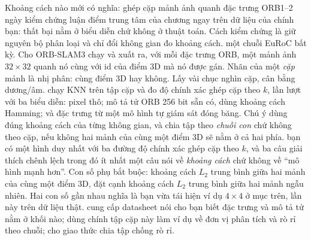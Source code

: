 \documentclass[../../deep_learning.tex]{subfiles}
\begin{document}
\begin{duan}{Khoảng cách nào mới có nghĩa: ghép cặp mảnh ảnh quanh đặc trưng ORB}{1--2 ngày}
\dmt kiểm chứng luận điểm trung tâm của chương ngay trên dữ liệu của chính bạn: thất bại nằm ở biểu diễn chứ không ở thuật toán. Cách kiểm chứng là giữ nguyên bộ phân loại và chỉ đổi không gian đo khoảng cách.
\ddl một chuỗi EuRoC bất kỳ. Cho ORB-SLAM3 chạy và xuất ra, với mỗi đặc trưng ORB, một mảnh ảnh \(32\times32\) quanh nó cùng với id của điểm 3D mà nó được gán. Nhãn của một \emph{cặp} mảnh là nhị phân: cùng điểm 3D hay không. Lấy vài chục nghìn cặp, cân bằng dương/âm.
\dbc chạy KNN trên tập cặp và đo độ chính xác ghép cặp theo \(k\), lần lượt với ba biểu diễn: pixel thô; mô tả tử ORB 256 bit sẵn có, dùng khoảng cách Hamming; và đặc trưng từ một mô hình tự giám sát đóng băng. Chú ý dùng đúng khoảng cách của từng không gian, và chia tập theo \emph{chuỗi con} chứ không theo cặp, nếu không hai mảnh của cùng một điểm 3D sẽ nằm ở cả hai phía.
\dxk bạn có một hình duy nhất với ba đường độ chính xác ghép cặp theo \(k\), và ba câu giải thích chênh lệch trong đó ít nhất một câu nói về \emph{khoảng cách} chứ không về ``mô hình mạnh hơn''. Con số phụ bắt buộc: khoảng cách \(L_2\) trung bình giữa hai mảnh của cùng một điểm 3D, đặt cạnh khoảng cách \(L_2\) trung bình giữa hai mảnh ngẫu nhiên. Hai con số gần nhau nghĩa là bạn vừa tái hiện ví dụ \(4\times4\) ở mục trên, lần này trên dữ liệu thật.
\dnv {} cung cấp datasheet nói cho bạn biết đặc trưng và mô tả tử nằm ở khối nào;  dùng chính tập cặp này làm ví dụ về đơn vị phân tích và rò rỉ theo chuỗi;  cho giao thức chia tập chống rò rỉ.
\end{duan}

\begin{traloi}
\end{traloi}
\end{document}

